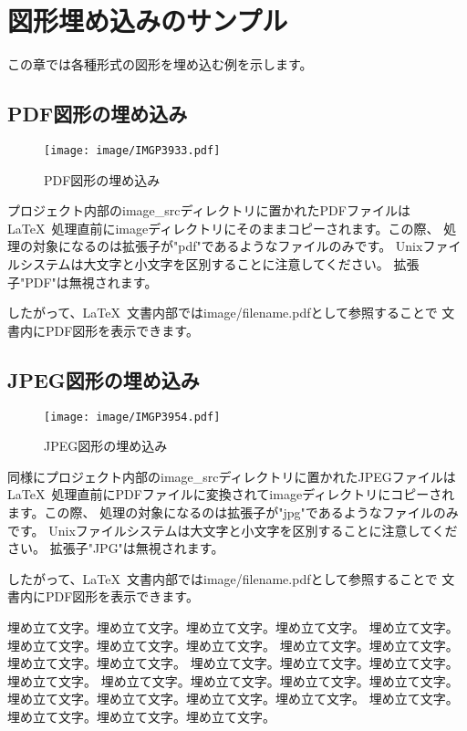 \chapter{図形埋め込みのサンプル}
\label{sec:figure_sample}

この章では各種形式の図形を埋め込む例を示します。

\section{PDF図形の埋め込み}
\begin{wrapfigure}[9]{O}[0pt]{0\textwidth}
  \texttt{[image: image/IMGP3933.pdf]}
  \caption{PDF図形の埋め込み}\label{embeded_pdf}
\end{wrapfigure}

プロジェクト内部のimage\_srcディレクトリに置かれたPDFファイルは\LaTeX\
処理直前にimageディレクトリにそのままコピーされます。この際、
処理の対象になるのは拡張子が"pdf"であるようなファイルのみです。
Unixファイルシステムは大文字と小文字を区別することに注意してください。
拡張子"PDF"は無視されます。

したがって、\LaTeX\ 文書内部ではimage/filename.pdfとして参照することで
文書内にPDF図形を表示できます。

\section{JPEG図形の埋め込み}

\begin{wrapfigure}[9]{O}[0pt]{0\textwidth}
  \texttt{[image: image/IMGP3954.pdf]}
  \caption{JPEG図形の埋め込み}\label{embeded_jpeg}
\end{wrapfigure}

同様にプロジェクト内部のimage\_srcディレクトリに置かれたJPEGファイルは\LaTeX\
処理直前にPDFファイルに変換されてimageディレクトリにコピーされます。この際、
処理の対象になるのは拡張子が"jpg"であるようなファイルのみです。
Unixファイルシステムは大文字と小文字を区別することに注意してください。
拡張子"JPG"は無視されます。

したがって、\LaTeX\ 文書内部ではimage/filename.pdfとして参照することで
文書内にPDF図形を表示できます。

埋め立て文字。埋め立て文字。埋め立て文字。埋め立て文字。
埋め立て文字。埋め立て文字。埋め立て文字。埋め立て文字。
埋め立て文字。埋め立て文字。埋め立て文字。埋め立て文字。
埋め立て文字。埋め立て文字。埋め立て文字。埋め立て文字。
埋め立て文字。埋め立て文字。埋め立て文字。埋め立て文字。
埋め立て文字。埋め立て文字。埋め立て文字。埋め立て文字。
埋め立て文字。埋め立て文字。埋め立て文字。埋め立て文字。

